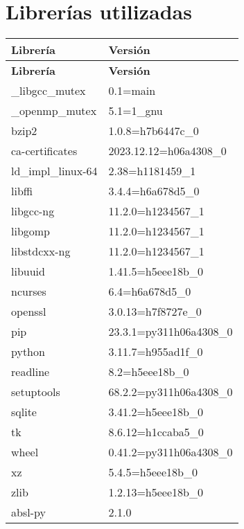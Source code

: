 \chapter{Librerías utilizadas}
\label{anexo:librerias}

\begin{longtable}{|l|l|}
	\hline
	\textbf{Librería} & \textbf{Versión} \\ \hline
	\hline
	\endfirsthead
	\hline
	\textbf{Librería} & \textbf{Versión} \\ \hline
	\endhead
	\hline
	\endfoot
	\hline
	\endlastfoot
	\_libgcc\_mutex      & 0.1=main        \\ \hline
	\_openmp\_mutex      & 5.1=1\_gnu      \\ \hline
	bzip2                & 1.0.8=h7b6447c\_0 \\ \hline
	ca-certificates      & 2023.12.12=h06a4308\_0 \\ \hline
	ld\_impl\_linux-64   & 2.38=h1181459\_1 \\ \hline
	libffi               & 3.4.4=h6a678d5\_0 \\ \hline
	libgcc-ng            & 11.2.0=h1234567\_1 \\ \hline
	libgomp              & 11.2.0=h1234567\_1 \\ \hline
	libstdcxx-ng         & 11.2.0=h1234567\_1 \\ \hline
	libuuid              & 1.41.5=h5eee18b\_0 \\ \hline
	ncurses              & 6.4=h6a678d5\_0 \\ \hline
	openssl              & 3.0.13=h7f8727e\_0 \\ \hline
	pip                  & 23.3.1=py311h06a4308\_0 \\ \hline
	python               & 3.11.7=h955ad1f\_0 \\ \hline
	readline             & 8.2=h5eee18b\_0 \\ \hline
	setuptools           & 68.2.2=py311h06a4308\_0 \\ \hline
	sqlite               & 3.41.2=h5eee18b\_0 \\ \hline
	tk                   & 8.6.12=h1ccaba5\_0 \\ \hline
	wheel                & 0.41.2=py311h06a4308\_0 \\ \hline
	xz                   & 5.4.5=h5eee18b\_0 \\ \hline
	zlib                 & 1.2.13=h5eee18b\_0 \\ \hline
	absl-py              & 2.1.0 \\ \hline

\end{longtable}
